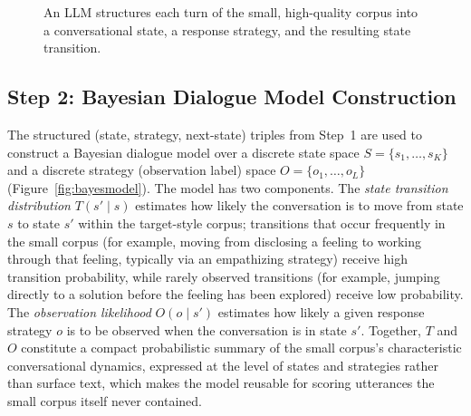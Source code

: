 \documentclass[manuscript,review,anonymous]{acmart}
\begin{document}
\begin{figure}[t]
  \centering
  \caption{An LLM structures each turn of the small, high-quality corpus into a conversational state, a response strategy, and the resulting state transition.}
  \label{fig:features}
\end{figure}

\subsection{Step 2: Bayesian Dialogue Model Construction}
\label{sec:bayesmodel}
The structured (state, strategy, next-state) triples from Step~1 are used to construct a Bayesian dialogue model over a discrete state space $S = \{s_1, \dots, s_K\}$ and a discrete strategy (observation label) space $O = \{o_1, \dots, o_L\}$ (Figure~\ref{fig:bayesmodel}). The model has two components. The \emph{state transition distribution} $T(s' \mid s)$ estimates how likely the conversation is to move from state $s$ to state $s'$ within the target-style corpus; transitions that occur frequently in the small corpus (for example, moving from disclosing a feeling to working through that feeling, typically via an empathizing strategy) receive high transition probability, while rarely observed transitions (for example, jumping directly to a solution before the feeling has been explored) receive low probability. The \emph{observation likelihood} $O(o \mid s')$ estimates how likely a given response strategy $o$ is to be observed when the conversation is in state $s'$. Together, $T$ and $O$ constitute a compact probabilistic summary of the small corpus's characteristic conversational dynamics, expressed at the level of states and strategies rather than surface text, which makes the model reusable for scoring utterances the small corpus itself never contained.
\end{document}
